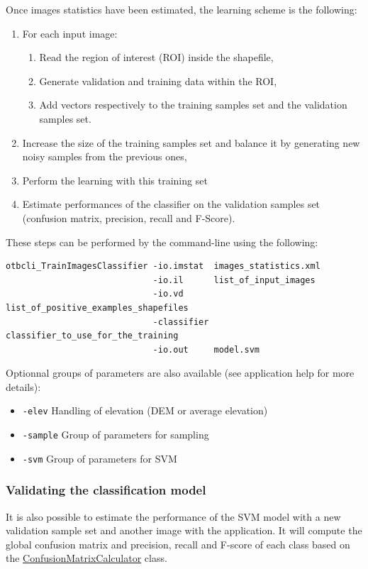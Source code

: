 Once images statistics have been estimated, the learning scheme is the following:
\begin{enumerate}
  \item For each input image:
  \begin{enumerate}
    \item Read the region of interest (ROI) inside the shapefile,
    \item Generate validation and training data within the ROI,
    \item Add vectors respectively to the training samples set and the validation
    samples set.
  \end{enumerate}
  \item Increase the size of the training samples set and balance it by
  generating new noisy samples from the previous ones,
  \item Perform the learning with this training set
  \item Estimate performances of the classifier on the validation samples set
  (confusion matrix, precision, recall and F-Score).
\end{enumerate}

These steps can be performed by the 
command-line using the following:

\begin{verbatim}
otbcli_TrainImagesClassifier -io.imstat  images_statistics.xml
                             -io.il      list_of_input_images
                             -io.vd      list_of_positive_examples_shapefiles
                             -classifier classifier_to_use_for_the_training
                             -io.out     model.svm
\end{verbatim}

Optionnal groups of parameters are also available (see application help for
more details):
\begin{itemize}
\item \verb?-elev? Handling of elevation (DEM or average elevation)
\item \verb?-sample? Group of parameters for sampling
\item \verb?-svm? Group of parameters for SVM
\end{itemize}

\subsubsection{Validating the classification model}
It is also possible to estimate the performance of the SVM model with a
new validation sample set and another image with the
 application. It will compute
the global confusion matrix and precision, recall and F-score of each
class based on the \href{http://www.orfeo-toolbox.org/doxygen-current/classotb_1_1ConfusionMatrixCalculator.html}{ConfusionMatrixCalculator}
class.

